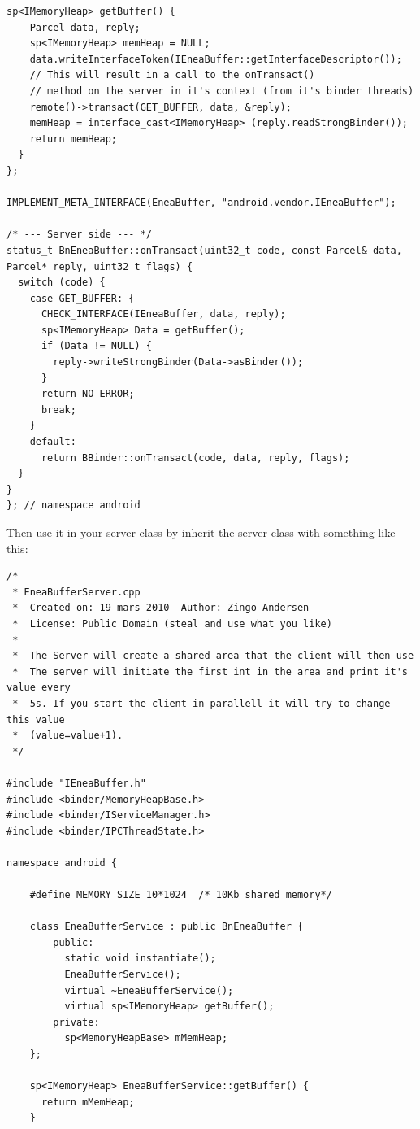 \documentclass[a4paper,11pt]{article}
\begin{document}
\begin{appendices}
\begin{lstlisting}[caption=Interface class: IEneaBuffer.cpp, label=IEneaBufferCPP]
  sp<IMemoryHeap> getBuffer() {
    Parcel data, reply;
    sp<IMemoryHeap> memHeap = NULL;
    data.writeInterfaceToken(IEneaBuffer::getInterfaceDescriptor());
    // This will result in a call to the onTransact()
    // method on the server in it's context (from it's binder threads)
    remote()->transact(GET_BUFFER, data, &reply);
    memHeap = interface_cast<IMemoryHeap> (reply.readStrongBinder());
    return memHeap;
  }
};

IMPLEMENT_META_INTERFACE(EneaBuffer, "android.vendor.IEneaBuffer");

/* --- Server side --- */ 
status_t BnEneaBuffer::onTransact(uint32_t code, const Parcel& data, Parcel* reply, uint32_t flags) {
  switch (code) {
    case GET_BUFFER: {
      CHECK_INTERFACE(IEneaBuffer, data, reply);
      sp<IMemoryHeap> Data = getBuffer();
      if (Data != NULL) {
        reply->writeStrongBinder(Data->asBinder());
      }
      return NO_ERROR;
      break;
    }
    default:
      return BBinder::onTransact(code, data, reply, flags);
  }
} 
}; // namespace android
\end{lstlisting}


Then use it in your server class by inherit the server class with something
like this:


\begin{lstlisting}[caption=Server command: EneaBufferServer.cpp,
    label={EneaBufferServer}]
/*
 * EneaBufferServer.cpp
 *  Created on: 19 mars 2010  Author: Zingo Andersen
 *  License: Public Domain (steal and use what you like)
 *
 *  The Server will create a shared area that the client will then use
 *  The server will initiate the first int in the area and print it's value every
 *  5s. If you start the client in parallell it will try to change this value
 *  (value=value+1).
 */ 

#include "IEneaBuffer.h"
#include <binder/MemoryHeapBase.h>
#include <binder/IServiceManager.h>
#include <binder/IPCThreadState.h>

namespace android {

    #define MEMORY_SIZE 10*1024  /* 10Kb shared memory*/

    class EneaBufferService : public BnEneaBuffer {
        public:
          static void instantiate();
          EneaBufferService();
          virtual ~EneaBufferService();
          virtual sp<IMemoryHeap> getBuffer();
        private:
          sp<MemoryHeapBase> mMemHeap;
    };

    sp<IMemoryHeap> EneaBufferService::getBuffer() {
      return mMemHeap;
    }


\end{lstlisting}
\end{appendices}
\end{document}
